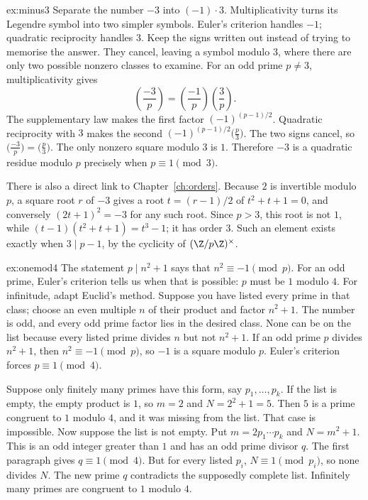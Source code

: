 \begin{solution}{ex:minus3}
\idea Separate the number $-3$ into $(-1)\cdot3$. Multiplicativity turns its Legendre symbol into two simpler symbols. Euler's criterion handles $-1$; quadratic reciprocity handles $3$. Keep the signs written out instead of trying to memorise the answer. They cancel, leaving a symbol modulo $3$, where there are only two possible nonzero classes to examine.
\writeup For an odd prime $p\ne3$, multiplicativity gives
\[
\left(\frac{-3}p\right)=\left(\frac{-1}p\right)\left(\frac3p\right).
\]
The supplementary law makes the first factor $(-1)^{(p-1)/2}$. Quadratic reciprocity with $3$ makes the second $(-1)^{(p-1)/2}\bigl(\frac p3\bigr)$. The two signs cancel, so
$\bigl(\frac{-3}p\bigr)=\bigl(\frac p3\bigr)$. The only nonzero square modulo $3$ is $1$. Therefore $-3$ is a quadratic residue modulo $p$ precisely when $p\equiv1\pmod3$.

There is also a direct link to Chapter~\ref{ch:orders}. Because $2$ is invertible modulo $p$, a square root $r$ of $-3$ gives a root $t=(r-1)/2$ of $t^2+t+1=0$, and conversely $(2t+1)^2=-3$ for any such root. Since $p>3$, this root is not $1$, while $(t-1)(t^2+t+1)=t^3-1$; it has order $3$. Such an element exists exactly when $3\mid p-1$, by the cyclicity of $(\Z/p\Z)^\times$.
\end{solution}

\begin{solution}{ex:onemod4}
\idea The statement $p\mid n^2+1$ says that $n^2\equiv-1\pmod p$. For an odd prime, Euler's criterion tells us when that is possible: $p$ must be $1$ modulo $4$. For infinitude, adapt Euclid's method. Suppose you have listed every prime in that class; choose an even multiple $n$ of their product and factor $n^2+1$. The number is odd, and every odd prime factor lies in the desired class. None can be on the list because every listed prime divides $n$ but not $n^2+1$.
\writeup If an odd prime $p$ divides $n^2+1$, then $n^2\equiv-1\pmod p$, so $-1$ is a square modulo $p$. Euler's criterion forces $p\equiv1\pmod4$.

Suppose only finitely many primes have this form, say $p_1,\ldots,p_k$. If the list is empty, the empty product is $1$, so $m=2$ and $N=2^2+1=5$. Then $5$ is a prime congruent to $1$ modulo $4$, and it was missing from the list. That case is impossible. Now suppose the list is not empty. Put $m=2p_1\cdots p_k$ and $N=m^2+1$. This is an odd integer greater than $1$ and has an odd prime divisor $q$. The first paragraph gives $q\equiv1\pmod4$. But for every listed $p_i$, $N\equiv1\pmod{p_i}$, so none divides $N$. The new prime $q$ contradicts the supposedly complete list. Infinitely many primes are congruent to $1$ modulo $4$.
\end{solution}

